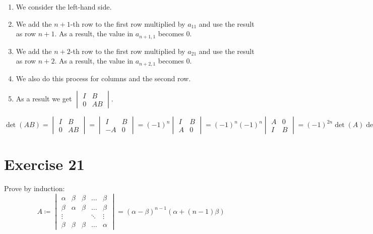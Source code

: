 \documentclass[a4paper]{article}
\theoremstyle{definition}
\begin{document}
\begin{enumerate}
  \item We consider the left-hand side.
  \item We add the $n+1$-th row to the first row multiplied by $a_{11}$ and use the result as row $n+1$.
    As a result, the value in $a_{n+1,1}$ becomes $0$.
  \item We add the $n+2$-th row to the first row multiplied by $a_{21}$ and use the result as row $n+2$.
    As a result, the value in $a_{n+2,1}$ becomes $0$.
  \item We also do this process for columns and the second row.
  \item As a result we get $\begin{vmatrix} I & B \\ 0 & AB \end{vmatrix}$.
\end{enumerate}

\[
  \det(AB)
  = \begin{vmatrix} I & B \\ 0 & AB \end{vmatrix}
  = \begin{vmatrix} I & B \\ -A & 0 \end{vmatrix}
  = (-1)^n \begin{vmatrix} I & B \\ A & 0 \end{vmatrix}
  = (-1)^n (-1)^n \begin{vmatrix} A & 0 \\ I & B \end{vmatrix}
  = (-1)^{2n} \det(A) \det(B)
\]


\section{Exercise 21}
\begin{ex}
  Prove by induction:
  \[
    A \coloneqq
    \begin{vmatrix}
      \alpha & \beta & \beta & \ldots & \beta \\
      \beta & \alpha & \beta & \ldots & \beta \\
      \vdots &       &       & \ddots & \vdots \\
      \beta & \beta & \beta & \ldots & \alpha
    \end{vmatrix}
    = (\alpha - \beta)^{n-1} (\alpha + (n - 1) \beta)
  \]
\end{ex}
\end{document}
